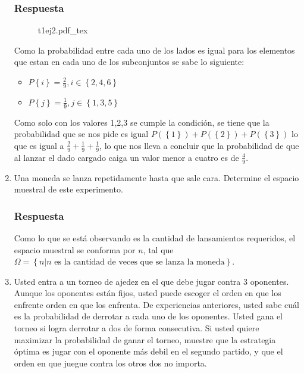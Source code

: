 \documentclass[dvipsnames,a4paper]{book}
\newcommand{\incfig}[2][1]{%
    \def\svgwidth{#1\columnwidth}
    {#2.pdf_tex}
}
\begin{document}
\begin{enumerate}[{Ej1. }]
\subsubsection{Respuesta}

\begin{figure}[ht]
    \centering
    \incfig[0.33]{t1ej2}
\end{figure}

Como la probabilidad entre cada uno de los lados es igual para los elementos
que estan en cada uno de los subconjuntos se sabe lo siguiente:

\begin{itemize}
    \item \(P\left\{i\right\}=\frac{2}{9},i\in\left\{2,4,6\right\} \)
    \item \(P\left\{j\right\}=\frac{1}{9},j\in\left\{1,3,5\right\} \)
\end{itemize}

Como solo con los valores {\color{Mahogany} 1,2,3} se cumple la condición, se
tiene que la probabilidad que se nos pide es igual
{\color{BrickRed} \(P\left(\left\{1\right\}\right)+P\left(\left\{2\right\}
\right)+P\left(\left\{3\right\}\right)\)} lo que es igual a {\color{
BrickRed}\(\frac{2}{9}+\frac{1}{9}+\frac{1}{9}\)}, lo que nos lleva a concluir
que la probabilidad de que al lanzar el dado cargado caiga un valor menor a
cuatro es de {\color{RedViolet} \(\frac{4}{9}\)}.

\item Una moneda se lanza repetidamente {\color{Salmon} hasta que sale cara}.
    Determine el espacio muestral de este experimento.
\subsubsection{Respuesta}
Como lo que se está observando es la cantidad de lansamientos requeridos, el
espacio muestral se conforma por \(n\), tal que \(\Omega = \left\{n|n\text{ es
la cantidad de veces que se lanza la moneda}\right\}\).


\item Usted entra a un torneo de ajedez en el que {\color{Sepia} debe jugar
    contra 3} oponentes. Aunque los oponentes están fijos,
    {\color{MidnightBlue} usted puede escoger el orden en que los enfrente
    orden en que los enfrenta}. De experiencias anteriores, usted sabe cuál es
    la probabilidad de derrotar a cada uno de los
    oponentes.{\color{JungleGreen} Usted gana el torneo si logra derrotar a dos
    de forma consecutiva}. Si usted quiere maximizar la probabilidad de ganar
    el torneo, {\color{Orchid} muestre que la estrategia óptima es jugar con el
    oponente más debil en el segundo partido, y que el orden en que juegue
contra los otros dos no importa}.

\end{enumerate}
\end{document}
